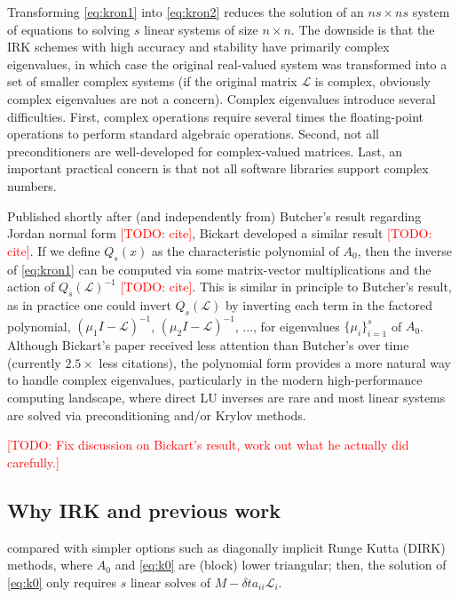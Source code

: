 \documentclass[a4paper,10pt]{article}
\makeatletter
\newcommand{\todo}[1]{\textcolor{red}{[TODO\@: #1]}}
\makeatother
\begin{document}
Transforming \eqref{eq:kron1} into \eqref{eq:kron2} reduces the solution of an $ns\times ns$
system of equations to solving $s$ linear systems of size $n\times n$. The downside is that the
IRK schemes with high accuracy and stability have primarily complex eigenvalues, in which case
the original real-valued system was transformed into a set of smaller complex systems (if the
original matrix $\mathcal{L}$ is complex, obviously complex eigenvalues are not a concern).
Complex eigenvalues introduce several difficulties. First, complex operations require several
times the floating-point operations to perform standard algebraic operations. Second, not
all preconditioners are well-developed for complex-valued matrices. Last, an important
practical concern is that not all software libraries support complex numbers. 

Published shortly after (and independently from) Butcher's result regarding Jordan normal
form \todo{cite}, Bickart developed a similar result \todo{cite}. If we define $Q_s(x)$ as the characteristic
polynomial of $A_0$, then the inverse of \eqref{eq:kron1} can be computed via some matrix-vector
multiplications and the action of $Q_s(\mathcal{L})^{-1}$ \todo{cite}. This is similar in principle to
Butcher's result, as in practice one could invert $Q_s(\mathcal{L})$ by inverting 
each term in the factored polynomial, $(\mu_1 I-\mathcal{L})^{-1}$,
$(\mu_2 I-\mathcal{L})^{-1}$, ..., for eigenvalues $\{\mu_i\}_{i=1}^s$ of $A_0$.
Although Bickart's paper received less attention than Butcher's over time (currently $2.5\times$
less citations), the polynomial form provides a more natural way to handle complex eigenvalues,
particularly in the modern high-performance computing landscape, where direct LU inverses
are rare and most linear systems are solved via preconditioning and/or Krylov methods. 

\todo{Fix discussion on Bickart's result, work out what he actually did carefully.}

\subsection{Why IRK and previous work}


 compared with simpler options such as
diagonally implicit Runge Kutta (DIRK) methods, where $A_0$ and \eqref{eq:k0} are 
(block) lower triangular; then, the solution of \eqref{eq:k0} only requires $s$ linear
solves of $M - \delta ta_{ii}\mathcal{L}_i$. 
\end{document}
